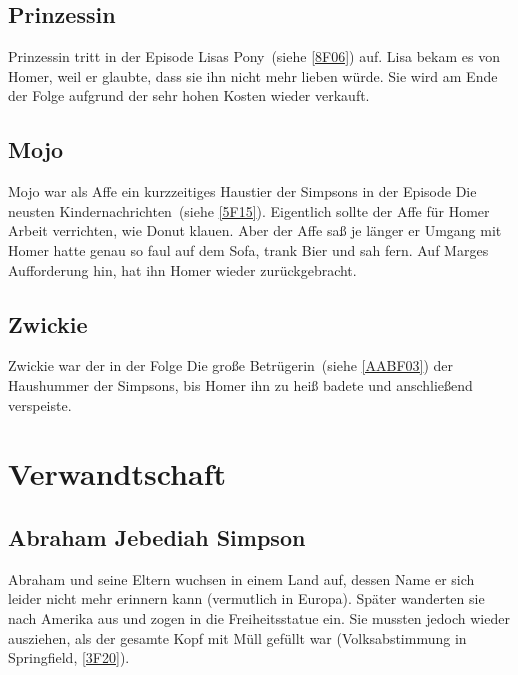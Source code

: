 \subsection{Prinzessin}
Prinzessin tritt in der Episode \glqq Lisas Pony\grqq\ (siehe \ref{8F06}) auf. Lisa bekam es von Homer, weil er glaubte, dass sie ihn nicht mehr lieben würde. Sie wird am Ende der Folge aufgrund der sehr hohen Kosten wieder verkauft.

\subsection{Mojo}
Mojo war als Affe ein kurzzeitiges Haustier der Simpsons in der Episode \glqq Die neusten Kindernachrichten\grqq\ (siehe \ref{5F15}). Eigentlich sollte der Affe für Homer Arbeit verrichten, wie Donut klauen. Aber der Affe saß je länger er Umgang mit Homer hatte genau so faul auf dem Sofa, trank Bier und sah fern. Auf Marges Aufforderung hin, hat ihn Homer wieder zurückgebracht. 

\subsection{Zwickie}
Zwickie war der in der Folge \glqq Die große Betrügerin\grqq\ (siehe \ref{AABF03}) der Haushummer der Simpsons, bis Homer ihn zu heiß badete und anschließend verspeiste.



\section{Verwandtschaft}

\subsection{Abraham Jebediah Simpson}\label{AbeSimpson}
Abraham und seine Eltern wuchsen in einem Land auf, dessen Name er sich leider nicht mehr erinnern kann (vermutlich in Europa). Später wanderten sie nach Amerika aus und zogen in die Freiheitsstatue ein. Sie mussten jedoch wieder ausziehen, als der gesamte Kopf mit Müll gefüllt war (\glqq Volksabstimmung in Springfield\grqq, \ref{3F20}).

